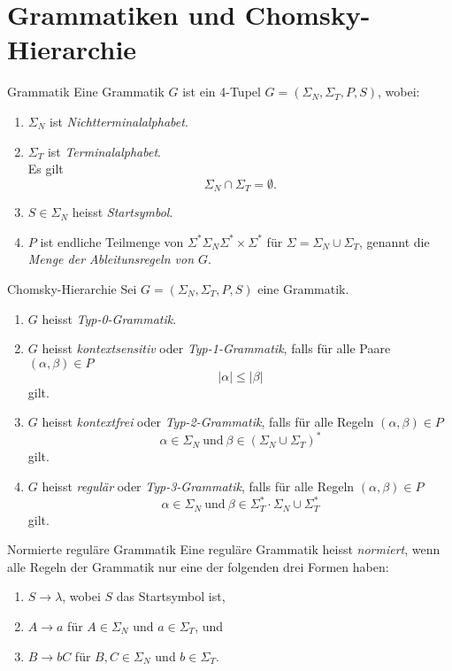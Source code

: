 \documentclass[a4paper,10pt]{article}
\begin{document}
\section{Grammatiken und Chomsky-Hierarchie}
\begin{mainbox}{Grammatik}
    Eine Grammatik $G$ ist ein 4-Tupel $G = (\Sigma_N, \Sigma_T, P, S)$, wobei:
    \begin{enumerate}
        \item $\Sigma_N$ ist \emph{Nichtterminalalphabet}.
        \item $\Sigma_T$ ist \emph{Terminalalphabet}.\\
        Es gilt
        \[\Sigma_N \cap \Sigma_T = \emptyset \text{.}\]
        \item $S \in \Sigma_N$ heisst \emph{Startsymbol}.
        \item $P$ ist endliche Teilmenge von $\Sigma^* \Sigma_N \Sigma^* \times \Sigma^*$ für $\Sigma = \Sigma_N \cup \Sigma_T$, genannt die \emph{Menge der Ableitunsregeln von $G$}.
    \end{enumerate}
\end{mainbox}
\begin{subbox}{Chomsky-Hierarchie}
    Sei $G = (\Sigma_N, \Sigma_T, P, S)$ eine Grammatik.
    \begin{enumerate}
        \item $G$ heisst \emph{Typ-0-Grammatik}.
        \item $G$ heisst \emph{kontextsensitiv} oder \emph{Typ-1-Grammatik}, falls für alle Paare $(\alpha, \beta) \in P$
        \[|\alpha| \leq |\beta|\]
        gilt.
        \item $G$ heisst \emph{kontextfrei} oder \emph{Typ-2-Grammatik}, falls für alle Regeln $(\alpha, \beta) \in P$
        \[\alpha \in \Sigma_N\ \text{und}\ \beta \in (\Sigma_N \cup \Sigma_T)^*\]
        gilt.
        \item $G$ heisst \emph{regulär} oder \emph{Typ-3-Grammatik}, falls für alle Regeln $(\alpha, \beta) \in P$
        \[\alpha \in \Sigma_N\ \text{und}\ \beta \in \Sigma_T^* \cdot \Sigma_N \cup \Sigma_T^*\]
        gilt.
    \end{enumerate}
\end{subbox}
\begin{subbox}{Normierte reguläre Grammatik}
    Eine reguläre Grammatik heisst \emph{normiert}, wenn alle Regeln der Grammatik nur eine der folgenden drei Formen haben:
    \begin{enumerate}
        \item $S \to \lambda$, wobei $S$ das Startsymbol ist,
        \item $A \to a$ für $A \in \Sigma_N$ und $a \in \Sigma_T$, und
        \item $B \to bC$ für $B, C \in \Sigma_N$ und $b \in \Sigma_T$.
    \end{enumerate}
\end{subbox}
\end{document}
